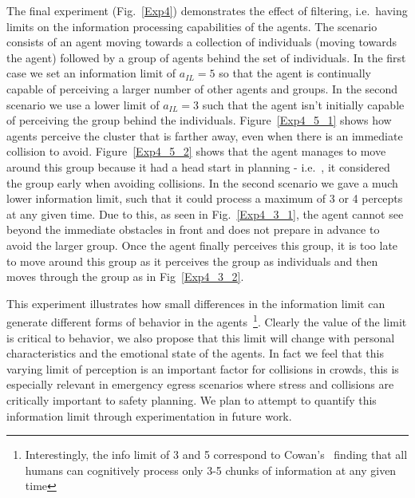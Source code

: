 \documentclass[runningheads,a4paper]{llncs}
\begin{document}
The final experiment (Fig.~\ref{Exp4}) demonstrates the effect of filtering, i.e.\ having limits on the information processing capabilities of the agents. The scenario consists of an agent moving towards a collection of individuals (moving towards the agent) followed by a group of agents behind the set of individuals. In the first case we set an information limit of $a_{IL} = 5$  so that the agent is continually capable of perceiving a larger number of other agents and groups.  In the second scenario we use a lower limit of $a_{IL} = 3$ such that the agent isn't initially capable of perceiving the group behind the individuals. Figure~\ref{Exp4_5_1} shows how agents perceive the cluster that is farther away, even when there is an immediate collision to avoid. Figure~\ref{Exp4_5_2} shows that the agent manages to move around this group because it had a head start in planning - i.e.\ , it considered the group early when avoiding collisions. In the second scenario we gave a much lower information limit, such that it could process a maximum of 3 or 4 percepts at any given time. Due to this, as seen in Fig.~\ref{Exp4_3_1}, the agent cannot see beyond the immediate obstacles in front and does not prepare in advance to avoid the larger group. Once the agent finally perceives this group, it is too late to move around this group as it perceives the group as individuals and then moves through the group as in Fig~\ref{Exp4_3_2}. 

This experiment illustrates how small differences in the information limit can generate different forms of behavior in the agents~\footnote{Interestingly, the info limit of 3 and 5 correspond to Cowan's~\cite{Cowan:2001wi} finding that all humans can cognitively process only 3-5 chunks of information at any given time}. Clearly the value of the limit is critical to behavior, we also propose that this limit will change with personal characteristics and the emotional state of the agents. In fact we feel that this varying limit of perception is an important factor for collisions in crowds, this is especially relevant in emergency egress scenarios where stress and collisions are critically important to safety planning. We plan to attempt to quantify this information limit through experimentation in future work.
\end{document}

